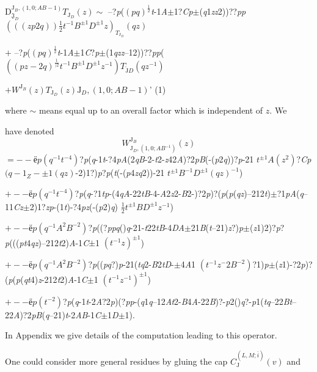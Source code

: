 \documentclass[a4paper,12pt]{article}
\begin{document}
$\mathrm{D}_{\mathfrak{J}_{D}}^{\mathrm{J}_{B},(1,0;AB- 1)}T_{\mathrm{J}_{D}}(z)\sim$ --?{\it p}($(pq)^{\frac{1}{2}}${\it t}-1{\it A}$\pm$1?{\it Cp}$\pm$({\it q}1{\it zz}2))??{\it pp}$(((zp2q))\displaystyle \frac{1}{2}t^{-1}B^{\pm 1}D^{\pm 1}z)_{T_{\mathrm{J}_{D}}}(qz)$

$+$ --?{\it p}($(pq)^{\frac{1}{2}}${\it t}-1{\it A}$\pm$1{\it C}?{\it p}$\pm$(1{\it qzz}--12))??{\it pp}($((pz-2q)^{\frac{1}{)2}}t^{-1}B^{\pm 1}D^{\pm 1}z^{-1})T_{\tilde{\mathrm{J}}D}(qz^{-1})$
\begin{center}
$+W^{\mathrm{J}_{B}}(z)T_{\mathrm{J}_{D}}(z)\mathrm{J}_{D},(1,0;AB-1)$' (1)
\end{center}
where $\sim$ means equal up to an overall factor which is independent of $z$. We

have denoted
$$
W_{\mathrm{J}_{D},(1,0;AB^{-1})}^{\mathrm{J}_{B}}(z)
$$
$=--ё p (q^{-1}t^{-4})$?{\it p}({\it q}-1{\it t}-?4{\it pA}(2{\it qB}-2-{\it t}2-{\it z}42{\it A})?2{\it pB}(-({\it p}2{\it q}))?{\it p}-21 $t^{\pm 1}A(z^{2})$?{\it Cp} $(q-1_{Z}-\pm 1(qz)$-2)1?){\it p}?{\it p}({\it t}(-({\it p}4{\it zq}2))-21 $t^{\pm 1}B^{-1}D^{\pm 1}(qz)^{-1}$)

$+--ё p (q^{-1}t^{-4})$?{\it p}({\it q}-?1{\it tp}-(4{\it qA}-22{\it tB}-4-{\it A}2{\it z}2-{\it B}2-)?2{\it p})?({\it p}({\it p}({\it qz})--212{\it t})$\pm$?1{\it pA}({\it q}--11{\it Cz}$\pm$2)1?{\it zp}-(1{\it t})-?4{\it pz}(-({\it p}2){\it q}) $\displaystyle \frac{1}{2}t^{\pm 1}BD^{\pm 1}z^{-1}$)

$+--ё p (q^{-1}A^{2}B^{-2})$?{\it p}((?{\it ppq}(){\it q}-21-{\it t}22{\it tB}-4{\it DA}$\pm$21{\it B}({\it t}--21){\it z}?){\it p}$\pm$({\it z}1)2)?{\it p}?{\it p}((({\it pt}4{\it qz})--212{\it t}2){\it A}-1{\it C}$\pm$1 $(t^{-1}z)^{\pm 1}$)

$+--ё p (q^{-1}A^{2}B^{-2})$?{\it p}(({\it pq}?){\it p}-21({\it tq}2-{\it B}2{\it tD}-$\pm$4{\it A}1 $(t^{-1}z^{-}2B^{-2})$?1){\it p}$\pm$({\it z}1)-?2{\it p})?({\it p}({\it p}({\it qt}4){\it z}-212{\it t}2){\it A}-1{\it C}$\pm$1 $(t^{-1}z^{-1})^{\pm 1}$)

$+--ё p (t^{-2})$?{\it p}({\it q}-1{\it t}-2{\it A}?2{\it p})(?{\it pp}-({\it q}1{\it q}--12{\it At}2-{\it B}4{\it A}-22{\it B})?-{\it p}2(){\it q}?-{\it p}1({\it tq}--22{\it Bt}--22{\it A})?2{\it pB}({\it q}--21){\it t}-2{\it AB}-1{\it C}$\pm$1{\it D}$\pm$1).

In Appendix we give details of the computation leading to this operator.

One could consider more general residues by gluing the cap $C_{\mathrm{J}}^{(L,M;\overline{i})}(v)$ and
\end{document}
